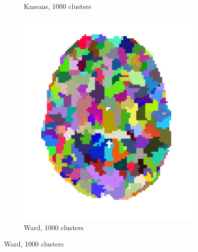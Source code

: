 \documentclass{article} %
\begin{document}
\begin{figure}
\begin{preview}
\begin{subfigure}[b]{.26\linewidth}
	\vspace*{-1.6em}
        \caption{\footnotesize\sffamily\hspace*{-.9ex}Kmeans, 1000 clusters}
      \end{subfigure}%
      \begin{subfigure}[b]{.26\linewidth}
        \includegraphics[width=\linewidth]{ward_1000}%
	\vspace*{-1.6em}
        \caption{\footnotesize\sffamily\hspace*{-.9ex}Ward, 1000 clusters}
      \end{subfigure}
\end{preview}
\end{figure}
\end{document}
